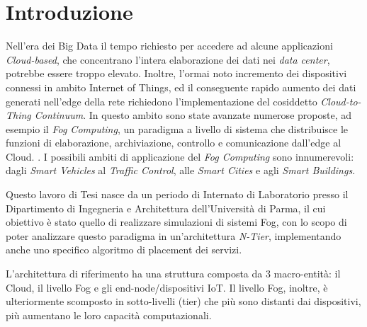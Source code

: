 \chapter*{Introduzione} %
\markboth{}{}

Nell'era dei Big Data il tempo richiesto per accedere ad alcune applicazioni \textit{Cloud-based}, che concentrano l'intera elaborazione dei dati nei \textit{data center}, potrebbe essere troppo elevato. Inoltre, l'ormai noto incremento dei dispositivi connessi in ambito Internet of Things, ed il conseguente rapido aumento dei dati generati nell'edge della rete richiedono l'implementazione del cosiddetto \textit{Cloud-to-Thing Continuum}. In questo ambito sono state avanzate numerose proposte, ad esempio il \textit{Fog Computing}, un paradigma a livello di sistema che distribuisce le funzioni di elaborazione, archiviazione, controllo e comunicazione dall'edge al Cloud. \cite{OpenFogReferenceArchitecture}. I possibili ambiti di applicazione del \textit{Fog Computing} sono innumerevoli: dagli \textit{Smart Vehicles} al \textit{Traffic Control}, alle \textit{Smart Cities} e agli \textit{Smart Buildings}.

Questo lavoro di Tesi nasce da un periodo di Internato di Laboratorio presso il Dipartimento di Ingegneria e Architettura dell'Università di Parma, il cui obiettivo è stato quello di realizzare simulazioni di sistemi Fog, con lo scopo di poter analizzare questo paradigma in un'architettura \textit{N-Tier}, implementando anche uno specifico algoritmo di placement dei servizi.

L'architettura di riferimento ha una struttura composta da 3 macro-entità: il Cloud, il livello Fog e gli end-node/dispositivi IoT. Il livello Fog, inoltre, è ulteriormente scomposto in sotto-livelli (tier) che più sono distanti dai dispositivi, più aumentano le loro capacità computazionali.

